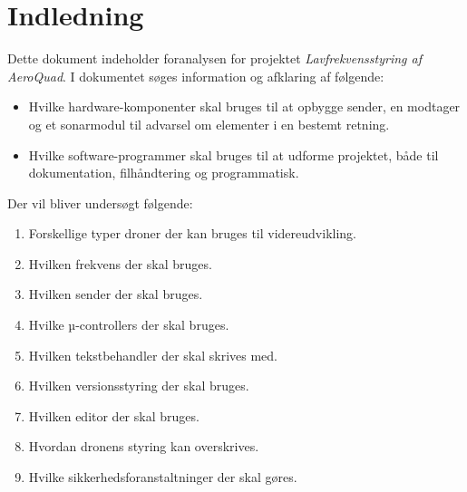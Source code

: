 \documentclass[Main]{subfiles}
\begin{document}
\chapter{Indledning}
\vspace{-20pt} %
Dette dokument indeholder foranalysen for projektet \textit{Lavfrekvensstyring af AeroQuad}.
I dokumentet søges information og afklaring af følgende:
\begin{itemize}
\item Hvilke hardware-komponenter skal bruges til at opbygge sender, en modtager og et sonarmodul til advarsel om elementer i en bestemt retning.
\item Hvilke software-programmer skal bruges til at udforme projektet, både til dokumentation, filhåndtering og programmatisk.
\end{itemize}

Der vil bliver undersøgt følgende:
\begin{enumerate}[label=P\arabic{enumi}.]
\item Forskellige typer droner der kan bruges til videreudvikling.
\item Hvilken frekvens der skal bruges.
\item Hvilken sender der skal bruges.
\item Hvilke µ-controllers der skal bruges.
\item Hvilken tekstbehandler der skal skrives med.
\item Hvilken versionsstyring der skal bruges.
\item Hvilken editor der skal bruges.
\item Hvordan dronens styring kan overskrives.
\item Hvilke sikkerhedsforanstaltninger der skal gøres.
\end{enumerate}
\end{document}
